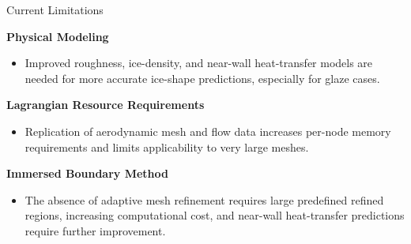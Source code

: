 \begin{frame}{Current Limitations}

\vspace{0.15cm}

{\color{champsBlue}\bfseries Physical Modeling}

\vspace{0.10cm}
\begin{itemize}
    \item Improved roughness, ice-density, and near-wall
    heat-transfer models are needed for more accurate
    ice-shape predictions, especially for glaze cases.
\end{itemize}

\vspace{0.30cm}

{\color{champsBlue}\bfseries Lagrangian Resource Requirements}

\vspace{0.10cm}
\begin{itemize}
    \item Replication of aerodynamic mesh and flow data
    increases per-node memory requirements and
    limits applicability to very large meshes.
\end{itemize}

\vspace{0.30cm}

{\color{champsBlue}\bfseries Immersed Boundary Method}

\vspace{0.10cm}
\begin{itemize}
    \item The absence of adaptive mesh refinement
    requires large predefined refined regions,
    increasing computational cost, and near-wall
    heat-transfer predictions require further improvement.
\end{itemize}

\end{frame}

